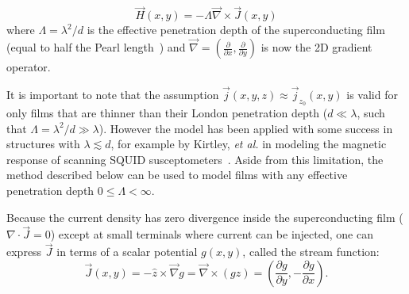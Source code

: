 \documentclass[final,3p,times,twocolumn]{elsarticle}
\newcounter{bla}
\begin{document}
\begin{equation}
    \label{eq:london}
    \vec{H}(x, y)=-\Lambda\vec{\nabla}\times\vec{J}(x, y)
\end{equation}
where $\Lambda=\lambda^2/d$ is the effective penetration depth
of the superconducting film (equal to half the Pearl length~\cite{Pearl1964-cl}) and $\vec{\nabla}=\left(\frac{\partial}{\partial x}, \frac{\partial}{\partial y}\right)$ is now the 2D gradient operator.

It is important to note that the assumption $\vec{j}(x, y, z)\approx\vec{j}_{z_0}(x, y)$ is valid for only films that are thinner than their London penetration depth ($d\ll\lambda$, such that $\Lambda=\lambda^2/d\gg\lambda$). However the model has been applied with some success in structures with $\lambda\lesssim d$, for example by Kirtley, \textit{et al.} in modeling the magnetic response of scanning SQUID susceptometers~\cite{Kirtley2016-zz,Kirtley2016-gt}. Aside from this limitation, the method described below can be used to model films with any effective penetration depth $0\leq\Lambda<\infty$.

Because the current density has zero divergence inside the superconducting film ($\nabla\cdot\vec{J}=0$)
except at small terminals where current can be injected, one can express $\vec{J}$ in terms
of a scalar potential $g(x, y)$, called the stream function:
\begin{equation}
    \label{eq:stream}
    \vec{J}(x, y) = -\hat{z}\times\vec{\nabla}g
    = \vec{\nabla}\times(g\hat{z})
    = \left(\frac{\partial g}{\partial y}, -\frac{\partial g}{\partial x}\right).
\end{equation}
\end{document}
